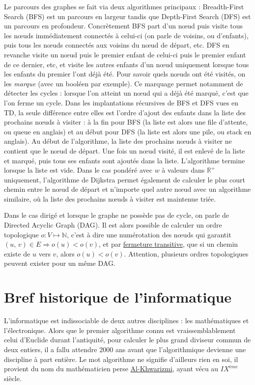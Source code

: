 \documentclass[10pt]{article}
\begin{document}
Le parcours des graphes se fait via deux algorithmes principaux : Breadth-First Search (BFS) est un parcours en largeur tandis que
Depth-First Search (DFS) est un parcours en profondeur. Concrètement BFS part d'un nœud puis visite tous les nœuds immédiatement connectés à celui-ci
(on parle de voisins, ou d'enfants), puis tous les nœuds connectés aux voisins du nœud de départ, etc. DFS en revanche visite un nœud puis le premier
enfant de celui-ci puis le premier enfant de ce dernier, etc, et visite les autres enfants d'un nœud uniquement lorsque tous les enfants du premier
l'ont déjà été. Pour savoir quels nœuds ont été visités, on les \emph{marque} (avec un booléen par exemple).
Ce marquage permet notamment de détecter les cycles : lorsque l'on
atteint un nœud qui a déjà été marqué, c'est que l'on ferme un cycle. Dans les implantations récursives de BFS et DFS vues en TD, la seule différence entre elles est l'ordre
d'ajout des enfants dans la liste des prochains nœuds à visiter : à la fin pour BFS (la liste est alors une file d'attente, ou queue en anglais)
et au début pour DFS (la liste est alors une pile, ou stack en anglais). Au début de l'algorithme, la liste des prochains nœuds à visiter ne contient
que le nœud de départ. Une fois un nœud visité, il est enlevé de la liste et marqué, puis tous ses enfants sont ajoutés dans la liste.
L'algorithme termine lorsque la liste est vide. Dans le cas pondéré avec $w$ à valeurs dans $\mathbb{R}^+$ uniquement,
l'algorithme de Dijkstra permet également de calculer le plus court chemin entre le nœud de départ et n'importe quel autre nœud
avec un algorithme similaire, où la liste des prochains nœuds à visiter est maintenue triée.

Dans le cas dirigé et lorsque le graphe ne possède pas de cycle, on parle de Directed Acyclic Graph (DAG). Il est alors possible de
calculer un ordre topologique $o : V \longmapsto \mathbb{N}$, c'est à dire une numérotation des nœuds qui garantit
$(u,\, v) \in E \Longrightarrow o(u) < o(v)$, et par \href{https://fr.wikipedia.org/wiki/Fermeture_transitive}{fermeture transitive},
que si un chemin existe de $u$ vers $v$, alors $o(u) < o(v)$.
Attention, plusieurs ordres topologiques peuvent exister pour un même DAG.


\section{Bref historique de l'informatique}

L'informatique est indissociable de deux autres disciplines : les mathématiques et l'électronique. Alors que le premier algorithme
connu est vraissemblablement celui d'Euclide durant l'antiquité, pour calculer le plus grand diviseur commun de deux entiers, il a fallu attendre
$2000$ ans avant que l'algorithmique devienne une discipline à part entière. Le mot algorithme ne signifie d'ailleurs rien en soi,
il provient du nom du mathématicien perse \href{https://fr.wikipedia.org/wiki/Al-Khw\%C3\%A2rizm\%C3\%AE}{Al-Khwarizmi}, ayant vécu au $IX^{\mathit{ème}}$ siècle.
\end{document}

